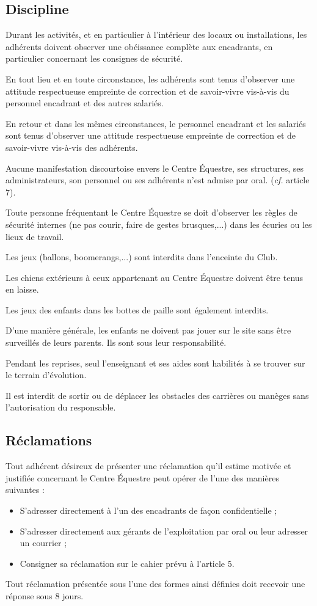 \documentclass[11pt,a4paper]{article}
\begin{document}
\subsection{Discipline}
Durant les activités, et en particulier à l'intérieur des locaux ou installations, les adhérents doivent observer une obéissance complète aux encadrants, en particulier concernant les consignes de sécurité.

En tout lieu et en toute circonstance, les adhérents sont tenus d'observer une attitude respectueuse empreinte de correction et de savoir-vivre vis-à-vis du personnel encadrant et des autres salariés.

En retour et dans les mêmes circonstances, le personnel encadrant et les salariés sont tenus d'observer une attitude respectueuse empreinte de correction et de savoir-vivre vis-à-vis des adhérents.

Aucune manifestation discourtoise envers le Centre Équestre, ses structures, ses administrateurs, son personnel ou ses adhérents n'est admise par oral.
(\textit{cf.} article 7). %

Toute personne fréquentant le Centre Équestre se doit d'observer les règles de sécurité internes (ne pas courir, faire de gestes brusques,...) dans les écuries ou les lieux de travail. %

Les jeux (ballons, boomerangs,...) sont interdits dans l'enceinte du Club.\par
Les chiens extérieurs à ceux appartenant au Centre Équestre doivent être tenus en laisse.\par
Les jeux des enfants dans les bottes de paille sont également interdits.

D'une manière générale, les enfants ne doivent pas jouer sur le site sans être surveillés de leurs parents.
Ils sont sous leur responsabilité.

Pendant les reprises, seul l'enseignant et ses aides sont habilités à se trouver sur le terrain d'évolution.

Il est interdit de sortir ou de déplacer les obstacles des carrières ou manèges sans l'autorisation du responsable.

\subsection{Réclamations}
Tout adhérent désireux de présenter une réclamation qu'il estime motivée et justifiée concernant le Centre Équestre peut opérer de l'une des manières suivantes :
\begin{itemize}[leftmargin=50pt]
\item
S'adresser directement à l'un des encadrants de façon confidentielle ;
\item
S'adresser directement aux gérants de l'exploitation par oral ou leur adresser un courrier ;
\item
Consigner sa réclamation sur le cahier prévu à l'article 5.
\end{itemize}
Tout réclamation présentée sous l'une des formes ainsi définies doit recevoir une réponse sous 8 jours.
\end{document}
